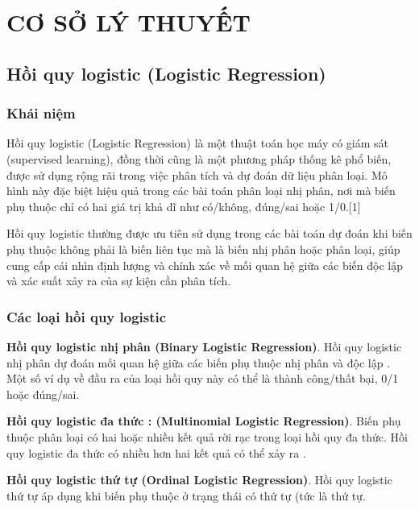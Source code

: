 \documentclass[
]{article}
\begin{document}
\newpage

\section{CƠ SỞ LÝ THUYẾT}\label{cux1a1-sux1edf-luxfd-thuyux1ebft}

\subsection{Hồi quy logistic (Logistic
Regression)}\label{hux1ed3i-quy-logistic-logistic-regression}

\subsubsection{Khái niệm}\label{khuxe1i-niux1ec7m}

Hồi quy logistic (Logistic Regression) là một thuật toán học máy có giám
sát (supervised learning), đồng thời cũng là một phương pháp thống kê
phổ biến, được sử dụng rộng rãi trong việc phân tích và dự đoán dữ liệu
phân loại. Mô hình này đặc biệt hiệu quả trong các bài toán phân loại
nhị phân, nơi mà biến phụ thuộc chỉ có hai giá trị khả dĩ như có/không,
đúng/sai hoặc 1/0.{[}1{]}

Hồi quy logistic thường được ưu tiên sử dụng trong các bài toán dự đoán
khi biến phụ thuộc không phải là biến liên tục mà là biến nhị phân hoặc
phân loại, giúp cung cấp cái nhìn định lượng và chính xác về mối quan hệ
giữa các biến độc lập và xác suất xảy ra của sự kiện cần phân tích.

\subsubsection{Các loại hồi quy
logistic}\label{cuxe1c-loux1ea1i-hux1ed3i-quy-logistic}

\textbf{Hồi quy logistic nhị phân (Binary Logistic Regression)}. Hồi quy
logistic nhị phân dự đoán mối quan hệ giữa các biến phụ thuộc nhị phân
và độc lập . Một số ví dụ về đầu ra của loại hồi quy này có thể là thành
công/thất bại, 0/1 hoặc đúng/sai.

\textbf{Hồi quy logistic đa thức : (Multinomial Logistic Regression)}.
Biến phụ thuộc phân loại có hai hoặc nhiều kết quả rời rạc trong loại
hồi quy đa thức. Hồi quy logistic đa thức có nhiều hơn hai kết quả có
thể xảy ra .

\textbf{Hồi quy logistic thứ tự (Ordinal Logistic Regression)}. Hồi quy
logistic thứ tự áp dụng khi biến phụ thuộc ở trạng thái có thứ tự (tức
là thứ tự.
\end{document}
